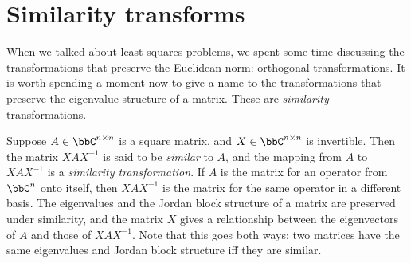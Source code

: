 \section{Similarity transforms}

When we talked about least squares problems, we spent some time
discussing the transformations that preserve the Euclidean norm:
orthogonal transformations.  It is worth spending a moment now to give
a name to the transformations that preserve the eigenvalue structure
of a matrix.  These are {\em similarity} transformations.

Suppose $A \in \bbC^{n \times n}$ is a square matrix, and $X \in
\bbC^{n \times n}$ is invertible.  Then the matrix $X A X^{-1}$ is
said to be {\em similar} to $A$, and the mapping from $A$ to $X A
X^{-1}$ is a {\em similarity transformation}.  If $A$ is the matrix for
an operator from $\bbC^n$ onto itself, then $X A X^{-1}$ is the matrix
for the same operator in a different basis.  The eigenvalues and the
Jordan block structure of a matrix are preserved under similarity, and
the matrix $X$ gives a relationship between the eigenvectors of $A$
and those of $X A X^{-1}$.  Note that this goes both ways: two
matrices have the same eigenvalues and Jordan block structure iff they
are similar.
